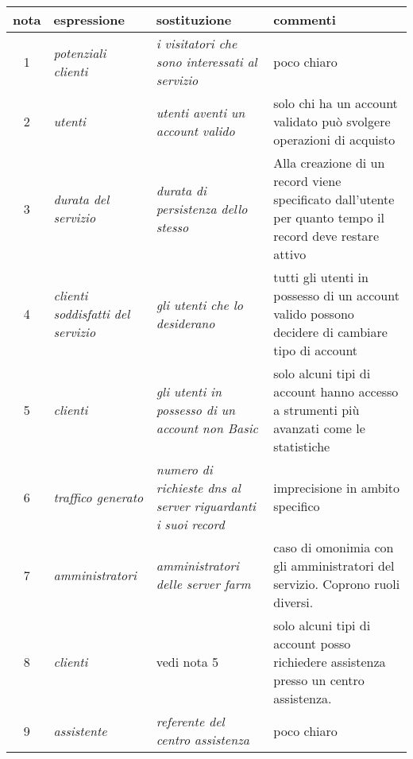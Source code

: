 \documentclass[11pt,a4paper] {article}
\begin{document}
\begin{tabular} {| c | p{3cm} | p{3cm} || p{5cm} |}
\hline
nota & espressione & sostituzione & commenti \\ \hline
1 & \textit{potenziali clienti} & \textit{i visitatori che sono interessati al servizio} & poco chiaro \\ \hline
2 & \textit{utenti} & \textit{utenti aventi un account valido} & solo chi ha un account validato pu\`o svolgere operazioni di acquisto \\ \hline
3 & \textit{durata del servizio} & \textit{durata di persistenza dello stesso} & Alla creazione di un record viene specificato dall'utente per quanto tempo il record deve restare attivo \\ \hline
4 & \textit{clienti soddisfatti del servizio} & \textit{gli utenti che lo desiderano} & tutti gli utenti in possesso di un account valido possono decidere di cambiare tipo di account \\ \hline
5 & \textit{clienti} & \textit{gli utenti in possesso di un account non Basic} & solo alcuni tipi di account hanno accesso a strumenti pi\`u avanzati come le statistiche \\ \hline
6 & \textit{traffico generato} & \textit{numero di richieste dns al server riguardanti i suoi record} & imprecisione in ambito specifico \\ \hline
7 & \textit{amministratori} & \textit{amministratori delle server farm} & caso di omonimia con gli amministratori del servizio. Coprono ruoli diversi. \\ \hline
8 & \textit{clienti} & vedi nota 5 & solo alcuni tipi di account posso richiedere assistenza presso un centro assistenza. \\ \hline
9 & \textit{assistente} & \textit{referente del centro assistenza} & poco chiaro \\ \hline
\end{tabular}

\newpage
\end{document}
